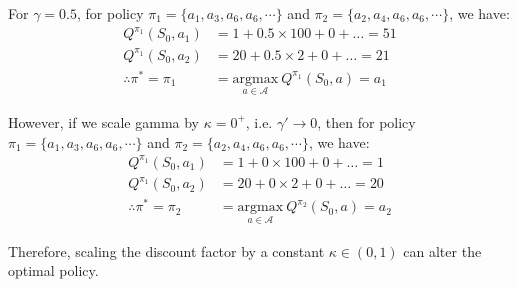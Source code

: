 \documentclass{article}
\newcommand{\A}{\mathcal{A}}
\begin{document}
\noindent
For $\gamma = 0.5$, for policy $\pi_1 = \{a_1, a_3, a_6, a_6, \cdots\}$ and $\pi_2 = \{a_2, a_4, a_6, a_6, \cdots\}$, we have:
\begin{align*}
	Q^{\pi_1}(S_0, a_1) &= 1 + 0.5 \times 100 + 0 + \ldots = 51 \\
	Q^{\pi_1}(S_0, a_2) &= 20 + 0.5 \times 2 + 0 + \ldots = 21  \\
	\therefore \pi^* = \pi_1 &= \underset{{a \in \A}}{\text{argmax}}\ Q^{\pi_1}(S_0, a) = a_1
\end{align*}

\noindent
However, if we scale gamma by $\kappa = 0^+$, i.e. $\gamma' \rightarrow 0$, then for policy $\pi_1 = \{a_1, a_3, a_6, a_6, \cdots\}$ and $\pi_2 = \{a_2, a_4, a_6, a_6, \cdots\}$, we have:
\begin{align*}
	Q^{\pi_1}(S_0, a_1) &= 1 + 0 \times 100 + 0 + \ldots = 1 \\
	Q^{\pi_1}(S_0, a_2) &= 20 + 0 \times 2 + 0 + \ldots = 20  \\
	\therefore \pi^* = \pi_2 &= \underset{{a \in \A}}{\text{argmax}}\ Q^{\pi_2}(S_0, a) = a_2
\end{align*}

\noindent
Therefore, scaling the discount factor by a constant $\kappa \in (0, 1)$ can alter the optimal policy.
\end{document}
